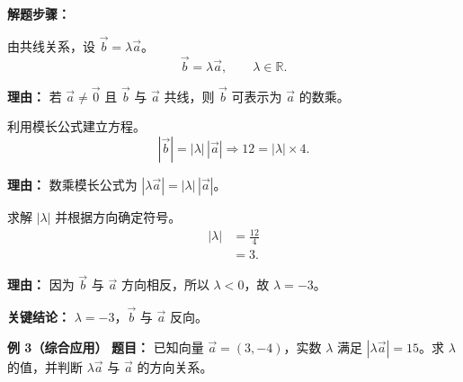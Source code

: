 \begin{examplebox}
	\textbf{\textcolor{CExample}{解题步骤：}}
	\begin{description}[style=nextline, leftmargin=2.8em, labelsep=0.5em, itemsep=0.45em]
		\item[\textbf{第一步（设定表示）：}]
		      由共线关系，设 $\vec{b}=\lambda\vec{a}$。
		      \[
			      \vec{b} = \lambda\vec{a},\qquad \lambda\in\mathbb{R}.
		      \]
		      \par\textbf{理由：} 若 $\vec{a}\neq\vec{0}$ 且 $\vec{b}$ 与 $\vec{a}$ 共线，则 $\vec{b}$ 可表示为 $\vec{a}$ 的数乘。
		\item[\textbf{第二步（模长关系）：}]
		      利用模长公式建立方程。
		      \[
			      |\vec{b}| = |\lambda|\,|\vec{a}| \Longrightarrow 12 = |\lambda|\times 4.
		      \]
		      \par\textbf{理由：} 数乘模长公式为 $|\lambda\vec{a}| = |\lambda|\,|\vec{a}|$。
		\item[\textbf{第三步（解出 $\lambda$）：}]
		      求解 $|\lambda|$ 并根据方向确定符号。
		      \[
			      \begin{aligned}
				      |\lambda| & = \frac{12}{4} \\
				                & = 3.
			      \end{aligned}
		      \]
		      \par\textbf{理由：} 因为 $\vec{b}$ 与 $\vec{a}$ 方向相反，所以 $\lambda<0$，故 $\lambda=-3$。
	\end{description}
	\textbf{\textcolor{CExample}{关键结论：}}
	$\lambda=-3$，$\vec{b}$ 与 $\vec{a}$ 反向。

	\medskip
	\textbf{\textcolor{CExample}{例 3（综合应用）}}
	\textbf{\textcolor{CExample}{题目：}}
	已知向量 $\vec{a}=(3,-4)$，实数 $\lambda$ 满足 $|\lambda\vec{a}|=15$。求 $\lambda$ 的值，并判断 $\lambda\vec{a}$ 与 $\vec{a}$ 的方向关系。


\end{examplebox}
